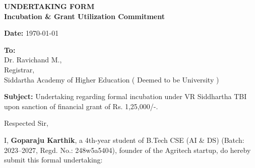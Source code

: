 \documentclass[11pt,a4paper]{article}
\begin{document}
\pagestyle{empty}

\begin{center}
    {\Large \textbf{UNDERTAKING FORM}}\\[0.2em]
    {\normalsize \textbf{Incubation \& Grant Utilization Commitment}}
\end{center}

\vspace{0.4em}

\begin{flushright}
    \textbf{Date:} \today \\
\end{flushright}

\vspace{-0.5em}

\begin{flushleft}
    \textbf{To:} \\
    Dr. Ravichand M., \\
    Registrar, \\
    Siddartha Academy of Higher Education ( Deemed to be University ) \\
\end{flushleft}

\vspace{0.3em}

\noindent\textbf{Subject:} Undertaking regarding formal incubation under VR Siddhartha TBI upon sanction of financial grant of Rs. 1,25,000/-.

\vspace{0.6em}

\noindent Respected Sir,

\vspace{0.4em}

\noindent I, \textbf{Goparaju Karthik}, a 4th-year student of B.Tech CSE (AI \& DS) (Batch: 2023--2027, Regd. No.: 248w5a5404), founder of the Agritech startup, do hereby submit this formal undertaking:
\end{document}
